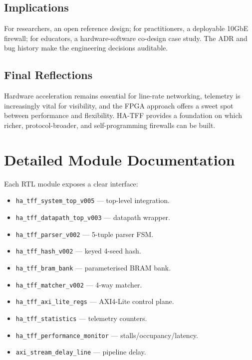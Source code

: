 \documentclass[12pt,twoside,openright]{book}
\begin{document}
\section{Implications}

For researchers, an open reference design; for practitioners, a deployable 10GbE firewall; for
educators, a hardware-software co-design case study. The ADR and bug history make the engineering
decisions auditable.

\section{Final Reflections}

Hardware acceleration remains essential for line-rate networking, telemetry is increasingly vital
for visibility, and the FPGA approach offers a sweet spot between performance and flexibility.
HA-TFF provides a foundation on which richer, protocol-broader, and self-programming firewalls can
be built.

\appendix

\chapter{Detailed Module Documentation}
\label{app:modules}

Each RTL module exposes a clear interface:

\begin{itemize}[itemsep=1pt]
  \item \texttt{ha\_tff\_system\_top\_v005} --- top-level integration.
  \item \texttt{ha\_tff\_datapath\_top\_v003} --- datapath wrapper.
  \item \texttt{ha\_tff\_parser\_v002} --- 5-tuple parser FSM.
  \item \texttt{ha\_tff\_hash\_v002} --- keyed 4-seed hash.
  \item \texttt{ha\_tff\_bram\_bank} --- parameterised BRAM bank.
  \item \texttt{ha\_tff\_matcher\_v002} --- 4-way matcher.
  \item \texttt{ha\_tff\_axi\_lite\_regs} --- AXI4-Lite control plane.
  \item \texttt{ha\_tff\_statistics} --- telemetry counters.
  \item \texttt{ha\_tff\_performance\_monitor} --- stalls/occupancy/latency.
  \item \texttt{axi\_stream\_delay\_line} --- pipeline delay.
\end{itemize}
\end{document}
